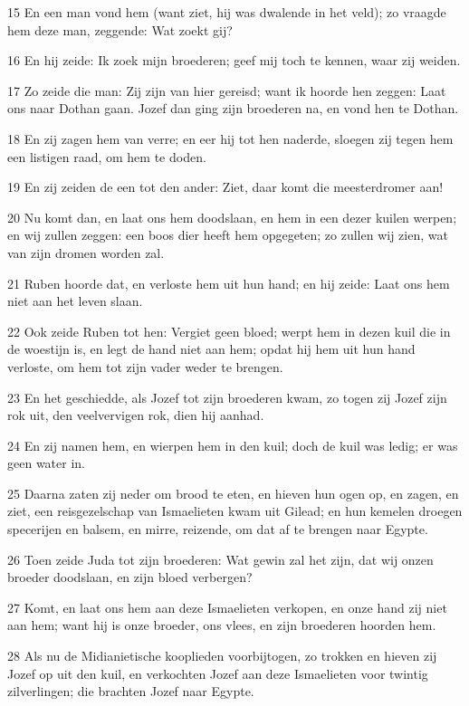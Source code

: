 \par 15 En een man vond hem (want ziet, hij was dwalende in het veld); zo vraagde hem deze man, zeggende: Wat zoekt gij?
\par 16 En hij zeide: Ik zoek mijn broederen; geef mij toch te kennen, waar zij weiden.
\par 17 Zo zeide die man: Zij zijn van hier gereisd; want ik hoorde hen zeggen: Laat ons naar Dothan gaan. Jozef dan ging zijn broederen na, en vond hen te Dothan.
\par 18 En zij zagen hem van verre; en eer hij tot hen naderde, sloegen zij tegen hem een listigen raad, om hem te doden.
\par 19 En zij zeiden de een tot den ander: Ziet, daar komt die meesterdromer aan!
\par 20 Nu komt dan, en laat ons hem doodslaan, en hem in een dezer kuilen werpen; en wij zullen zeggen: een boos dier heeft hem opgegeten; zo zullen wij zien, wat van zijn dromen worden zal.
\par 21 Ruben hoorde dat, en verloste hem uit hun hand; en hij zeide: Laat ons hem niet aan het leven slaan.
\par 22 Ook zeide Ruben tot hen: Vergiet geen bloed; werpt hem in dezen kuil die in de woestijn is, en legt de hand niet aan hem; opdat hij hem uit hun hand verloste, om hem tot zijn vader weder te brengen.
\par 23 En het geschiedde, als Jozef tot zijn broederen kwam, zo togen zij Jozef zijn rok uit, den veelvervigen rok, dien hij aanhad.
\par 24 En zij namen hem, en wierpen hem in den kuil; doch de kuil was ledig; er was geen water in.
\par 25 Daarna zaten zij neder om brood te eten, en hieven hun ogen op, en zagen, en ziet, een reisgezelschap van Ismaelieten kwam uit Gilead; en hun kemelen droegen specerijen en balsem, en mirre, reizende, om dat af te brengen naar Egypte.
\par 26 Toen zeide Juda tot zijn broederen: Wat gewin zal het zijn, dat wij onzen broeder doodslaan, en zijn bloed verbergen?
\par 27 Komt, en laat ons hem aan deze Ismaelieten verkopen, en onze hand zij niet aan hem; want hij is onze broeder, ons vlees, en zijn broederen hoorden hem.
\par 28 Als nu de Midianietische kooplieden voorbijtogen, zo trokken en hieven zij Jozef op uit den kuil, en verkochten Jozef aan deze Ismaelieten voor twintig zilverlingen; die brachten Jozef naar Egypte.
